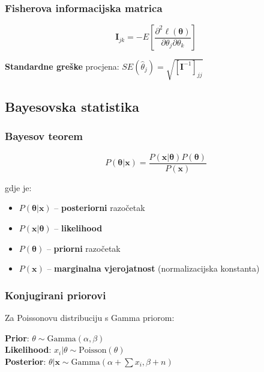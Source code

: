 \documentclass[11pt,oneside]{book}
\begin{document}
\subsubsection{Fisherova informacijska matrica}

\begin{equation}
	\mathbf{I}_{jk} = -E\left[\frac{\partial^2 \ell(\boldsymbol{\theta})}{\partial \theta_j \partial \theta_k}\right]
\end{equation}

\textbf{Standardne greške} procjena: $SE(\hat{\theta}_j) = \sqrt{[\mathbf{I}^{-1}]_{jj}}$

\subsection{Bayesovska statistika}

\subsubsection{Bayesov teorem}

\begin{equation}
	P(\boldsymbol{\theta} | \mathbf{x}) = \frac{P(\mathbf{x} | \boldsymbol{\theta}) P(\boldsymbol{\theta})}{P(\mathbf{x})}
\end{equation}

gdje je:
\begin{itemize}
	\item $P(\boldsymbol{\theta} | \mathbf{x})$ -- \textbf{posteriorni} razočetak
	\item $P(\mathbf{x} | \boldsymbol{\theta})$ -- \textbf{likelihood}
	\item $P(\boldsymbol{\theta})$ -- \textbf{priorni} razočetak
	\item $P(\mathbf{x})$ -- \textbf{marginalna vjerojatnost} (normalizacijska konstanta)
\end{itemize}

\subsubsection{Konjugirani priorovi}

Za Poissonovu distribuciju s Gamma priorom:

\textbf{Prior}: $\theta \sim \text{Gamma}(\alpha, \beta)$\\
\textbf{Likelihood}: $x_i | \theta \sim \text{Poisson}(\theta)$\\
\textbf{Posterior}: $\theta | \mathbf{x} \sim \text{Gamma}\left(\alpha + \sum x_i, \beta + n\right)$
\end{document}
